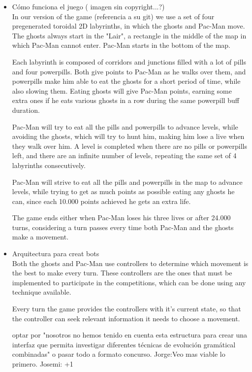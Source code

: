 \documentclass{llncs}
\newcommand{\paco}{Pac-Man }
\begin{document}
\begin{itemize}
\item Cómo funciona el juego ({\color{red} imagen sin copyright...?})
\\

In our version of the game {\color{red}(referencia a su git)} we use a set of four pregenerated toroidal 2D labyrinths, in which the ghosts and \paco move. The ghosts always start in the "Lair", a rectangle in the middle of the map in which \paco cannot enter. \paco starts in the bottom of the map.

Each labyrinth is composed of corridors and junctions filled with a lot of pills and four powerpills. Both give points to \paco as he walks over them, and powerpills make him able to eat the ghosts for a short period of time, while also slowing them. Eating ghosts will give \paco points, earning some extra ones if he eats various ghosts in a row during the same powerpill buff duration.

\paco will try to eat all the pills and powerpills to advance levels, while avoiding the ghosts, which will try to hunt him, making him lose a live when they walk over him. A level is completed when there are no pills or powerpills left, and there are an infinite number of levels, repeating the same set of 4 labyrinths consecutively.

\paco will strive to eat all the pills and powerpills in the map to advance levels, while trying to get as much points as possible eating any ghosts he can, since each 10.000 points achieved he gets an extra life.

The game ends either when \paco loses his three lives or after 24.000 turns, considering a turn passes every time both \paco and the ghosts make a movement.


\item Arquitectura para creat bots
\\

Both the ghosts and \paco use controllers to determine which movement is the best to make every turn. These controllers are the ones that must be implemented to participate in the competitions, which can be done using any technique available.

Every turn the game provides the controllers with it's current state, so that the controller can seek relevant information it needs to choose a movement. 

{\color{red}optar por "nosotros no hemos tenido en cuenta esta estructura para crear una interfaz que permita investigar diferentes técnicas de evolución gramátical combinadas" o pasar todo a formato concurso. Jorge:Veo mas viable lo primero. Josemi: +1}
\\


\end{itemize}
\end{document}
